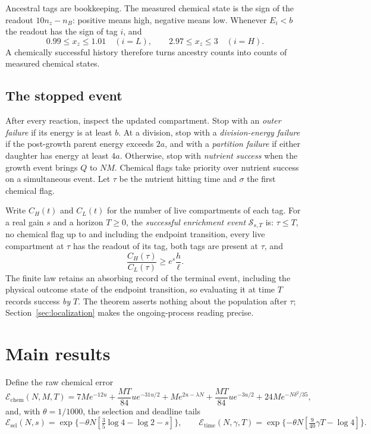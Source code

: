 \documentclass[11pt,a4paper]{article}
\theoremstyle{plain}
\theoremstyle{definition}
\theoremstyle{remark}
\newcommand{\cS}{\mathcal S}
\newcommand{\chem}{\mathcal E_{\mathrm{chem}}}
\newcommand{\Esel}{\mathcal E_{\mathrm{sel}}}
\newcommand{\Etime}{\mathcal E_{\mathrm{time}}}
\begin{document}
Ancestral tags are bookkeeping. The measured chemical state is the sign of the readout $10n_z-n_B$: positive means high, negative means low. Whenever $E_i<b$ the readout has the sign of tag $i$, and
\begin{equation}\label{eq:zsafe}
0.99\leq x_z\leq1.01\quad(i=L),\qquad 2.97\leq x_z\leq3\quad(i=H).
\end{equation}
A chemically successful history therefore turns ancestry counts into counts of measured chemical states.

\subsection{The stopped event}\label{sec:stopped}
After every reaction, inspect the updated compartment. Stop with an \emph{outer failure} if its energy is at least $b$. At a division, stop with a \emph{division-energy failure} if the post-growth parent energy exceeds $2a$, and with a \emph{partition failure} if either daughter has energy at least $4a$. Otherwise, stop with \emph{nutrient success} when the growth event brings $Q$ to $NM$. Chemical flags take priority over nutrient success on a simultaneous event. Let $\tau$ be the nutrient hitting time and $\sigma$ the first chemical flag.

Write $C_H(t)$ and $C_L(t)$ for the number of live compartments of each tag. For a real gain $s$ and a horizon $T\geq0$, the \emph{successful enrichment event} $\cS_{s,T}$ is: $\tau\leq T$, no chemical flag up to and including the endpoint transition, every live compartment at $\tau$ has the readout of its tag, both tags are present at $\tau$, and
\begin{equation}\label{eq:gain}
\frac{C_H(\tau)}{C_L(\tau)}\geq e^{s}\frac{h}{\ell}.
\end{equation}
The finite law retains an absorbing record of the terminal event, including the physical outcome state of the endpoint transition, so evaluating it at time $T$ records success \emph{by} $T$. The theorem asserts nothing about the population after $\tau$; Section~\ref{sec:localization} makes the ongoing-process reading precise.

\section{Main results}\label{sec:results}

Define the raw chemical error
\begin{equation}\label{eq:raw}
\chem(N,M,T)=7Me^{-12u}+\frac{MT}{84}ue^{-31u/2}+Me^{2u-\lambda N}+\frac{MT}{84}ue^{-3u/2}+24Me^{-N\delta^2/35},
\end{equation}
and, with $\theta=1/1000$, the selection and deadline tails
\begin{equation}\label{eq:tails}
\Esel(N,s)=\exp\{-\theta N[\tfrac35\log4-\log2-s]\},\qquad \Etime(N,\gamma,T)=\exp\{-\theta N[\tfrac{9}{40}\gamma T-\log4]\}.
\end{equation}
\end{document}

